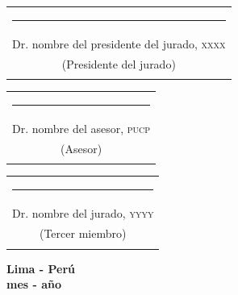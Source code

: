 \documentclass[12pt,a4paper,oneside,reqno]{book}%
\theoremstyle{definition}
\begin{document}
\vspace*{2cm}

\begin{center}
\begin{tabular}{c}
{\footnotesize \rule{7cm}{0.0009cm}} \\
{\footnotesize Dr. nombre del presidente del jurado, \textsc{xxxx}}\\
{\footnotesize (Presidente del jurado)}\\%
\\
\end{tabular}
\end{center}

\vspace*{1cm}

\begin{center}
\begin{tabular}{c}
{\footnotesize \rule{7cm}{0.0009cm}} \\
{\footnotesize Dr. nombre del asesor, \textsc{pucp}}\\
{\footnotesize (Asesor) }\\%
\\
\end{tabular}
\end{center}

\vspace*{1cm}

\begin{center}
\begin{tabular}{c}
{\footnotesize \rule{7cm}{0.0009cm}} \\
{\footnotesize Dr. nombre del jurado, \textsc{yyyy}}\\
{\footnotesize (Tercer miembro)}\\%
\\
\end{tabular}
\end{center}
%
\vspace*{1.5cm}
%
\begin{center}
{\baselineskip 10pt {\bf Lima - Per\'u}\\
{\bf mes - a\~{n}o}}%
\end{center}
\end{document}
